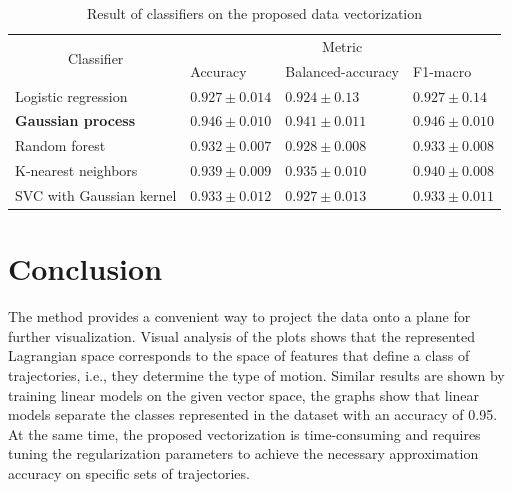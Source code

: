 \documentclass[sn-mathphys-num]{sn-jnl}
\theoremstyle{thmstylethree}
\theoremstyle{thmstyletwo}
\theoremstyle{thmstyleone}
\begin{document}
\begin{table}[!htbp]
    \caption{Result of classifiers on the proposed data vectorization}
    \centering
    \begin{tabular}{|l|lll|}
    \hline
    \multicolumn{1}{|c|}{\multirow{2}{*}{Classifier}} & \multicolumn{3}{c|}{Metric}                                                                     	\\ \hhline{~---} 
    \multicolumn{1}{|c|}{}                               & \multicolumn{1}{l|}{Accuracy}         & \multicolumn{1}{l|}{Balanced-accuracy} & F1-macro        \\ \hline
    Logistic regression                              & \multicolumn{1}{l|}{$0.927 \pm  0.014$} & \multicolumn{1}{l|}{$0.924 \pm 0.13$}    & $0.927 \pm 0.14$  \\ \hline
    \textbf{Gaussian process}                                  & \multicolumn{1}{l|}{$\mathbf{0.946} \pm \mathbf{0.010}$}  & \multicolumn{1}{l|}{$\mathbf{0.941} \pm \mathbf{0.011}$}   & $\mathbf{0.946} \pm \mathbf{0.010}$ \\ \hline
    Random forest                                        & \multicolumn{1}{l|}{$0.932 \pm 0.007$}  & \multicolumn{1}{l|}{$0.928 \pm 0.008$}   & $0.933 \pm 0.008$ \\ \hline
    K-nearest neighbors                                  & \multicolumn{1}{l|}{$0.939 \pm 0.009$}  & \multicolumn{1}{l|}{$0.935 \pm 0.010$}   & $0.940 \pm 0.008$ \\ \hline
    SVC with Gaussian kernel                             & \multicolumn{1}{l|}{$0.933 \pm 0.012$}  & \multicolumn{1}{l|}{$0.927 \pm 0.01$3}   & $0.933 \pm 0.011$ \\ \hline
    \end{tabular}
    \label{table:classifictors}
\end{table}

\section{Conclusion}

The method provides a convenient way to project the data onto a plane for further visualization. Visual analysis of the plots shows that the represented Lagrangian space corresponds to the space of features that define a class of trajectories, i.e., they determine the type of motion. Similar results are shown by training linear models on the given vector space, the graphs show that linear models separate the classes represented in the dataset with an accuracy of 0.95. At the same time, the proposed vectorization is time-consuming and requires tuning the regularization parameters to achieve the necessary approximation accuracy on specific sets of trajectories.
\end{document}
